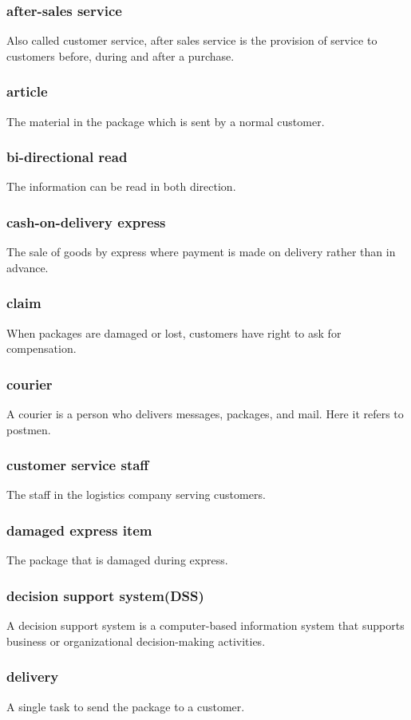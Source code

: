 \documentclass[12pt]{scrreprt}
\begin{document}
\begin{spacing}{0.7}
\subsubsection{after-sales service}
Also called customer service, after sales service is the provision of
service to customers before, during and after a purchase.
\subsubsection{article}
The material in the package which is sent by a normal customer.
\subsubsection{bi-directional read}
The information can be read in both direction.
\subsubsection{cash-on-delivery express}
The sale of goods by express where payment is made on delivery rather
than in advance.
\subsubsection{claim}
When packages are damaged or lost, customers have right to ask for compensation.
\subsubsection{courier}
A courier is a person who delivers messages, packages, and mail. Here it refers
to postmen.
\subsubsection{customer service staff}
The staff in the logistics company serving customers.
\subsubsection{damaged express item}
The package that is damaged during express.
\subsubsection{decision support system(DSS)}
A decision support system is a computer-based information system that supports
 business or organizational decision-making activities.
\subsubsection{delivery}
A single task to send the package to a customer.

\end{spacing}
\end{document}
